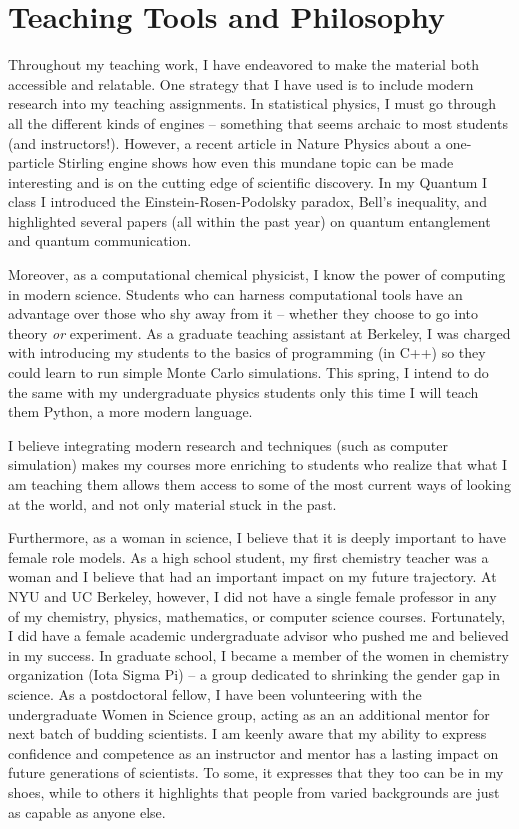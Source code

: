 \documentclass[11pt]{article}
\begin{document}
\section{Teaching Tools and Philosophy}

Throughout my teaching work, I have endeavored to make the material both accessible and relatable.  One strategy that I have used is to include modern research into my teaching assignments.  In statistical physics, I must go through all the different kinds of engines -- something that seems archaic to most students (and instructors!).  However, a recent article in Nature Physics about a one-particle Stirling engine shows how even this mundane topic can be made interesting and is on the cutting edge of scientific discovery.  In my Quantum I class I introduced the Einstein-Rosen-Podolsky paradox, Bell's inequality, and highlighted several papers (all within the past year) on quantum entanglement and quantum communication.

Moreover, as a computational chemical physicist, I know the power of computing in modern science.  Students who can harness computational tools have an advantage over those who shy away from it  -- whether they choose to go into theory \textit{or} experiment.  As a graduate teaching assistant at Berkeley, I was charged with introducing my students to the basics of programming (in C++) so they could learn to run simple Monte Carlo simulations.  This spring, I intend to do the same with my undergraduate physics students only this time I will teach them Python, a more modern language.

I believe integrating modern research and techniques (such as computer simulation) makes my courses more enriching to students who realize that what I am teaching them allows them access to some of the most current ways of looking at the world, and not only material stuck in the past.

Furthermore, as a woman in science, I believe that it is deeply important to have female role models.  As a high school student, my first chemistry teacher was a woman and I believe that had an important impact on my future trajectory.  At NYU and UC Berkeley, however, I did not have a single female professor in any of my chemistry, physics, mathematics, or computer science courses.  Fortunately, I did have a female academic undergraduate advisor who pushed me and believed in my success.  In graduate school, I became a member of the women in chemistry organization (Iota Sigma Pi) -- a group dedicated to shrinking the gender gap in science.  As a postdoctoral fellow, I have been volunteering with the undergraduate Women in Science group, acting as an an additional mentor for next batch of budding scientists.  I am keenly aware that my ability to express confidence and competence as an instructor and mentor has a lasting impact on future generations of scientists.  To some, it expresses that they too can be in my shoes, while to others it highlights that people from varied backgrounds are just as capable as anyone else.
\end{document}
